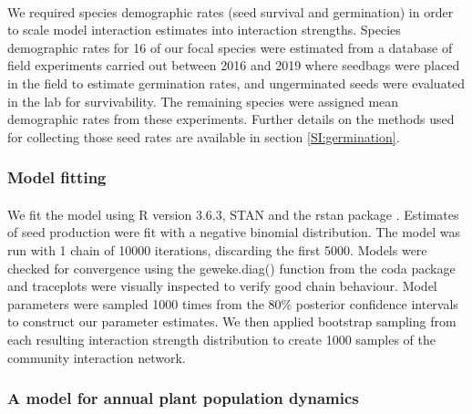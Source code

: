 \documentclass[a4,12pt]{article}
\begin{document}
        \paragraph{} 
        We required species demographic rates (seed survival and germination) in order to scale model interaction estimates into interaction strengths. Species demographic rates for 16 of our focal species were estimated from a database of field experiments carried out between 2016 and 2019 where seedbags were placed in the field to estimate germination rates, and ungerminated seeds were evaluated in the lab for survivability.  The remaining species were assigned mean demographic rates from these experiments. Further details on the methods used for collecting those seed rates are available in section \ref{SI:germination}.

        \subsubsection{Model fitting}

        \paragraph{}
        We fit the model using R version 3.6.3, STAN and the rstan package \parencite{R2020, Carpenter2017, Rstan2020}. Estimates of seed production were fit with a negative binomial distribution. The model was run with 1 chain of 10000 iterations, discarding the first 5000. Models were checked for convergence using the geweke.diag() function from the coda package \parencite{Plummer2006} and traceplots were visually inspected to verify good chain behaviour. Model parameters were sampled 1000 times from the 80\% posterior confidence intervals to construct our parameter estimates. We then applied bootstrap sampling from each resulting interaction strength distribution to create 1000 samples of the community interaction network.

        \subsubsection{A model for annual plant population dynamics}
        \label{SI:popdyn}
\end{document}
